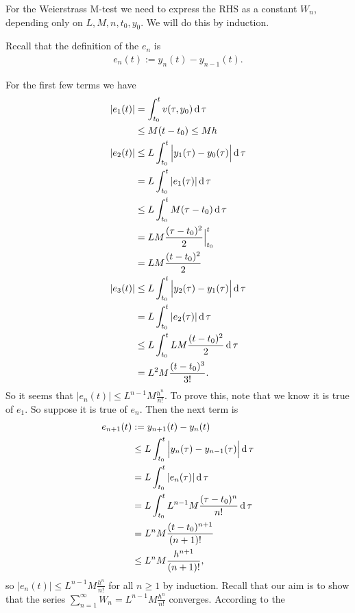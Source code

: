 For the Weierstrass M-test we need to express the RHS as a constant $W_n$,
depending only on $L, M, n, t_0, y_0$. We will do this by induction.

\newpage
Recall that the definition of the $e_n$ is
\begin{align*}
  e_n(t) := y_n(t) - y_{n-1}(t).
\end{align*}

For the first few terms we have
\begin{align*}
  |e_1(t)| &    = \int_{t_0}^t v(\tau, y_0) \operatorname{\text{d}}\tau\\
           & \leq M(t - t_0) \leq Mh\\
  |e_2(t)| & \leq L\int_{t_0}^t \Big|y_1(\tau) - y_0(\tau)\Big| \operatorname{\text{d}}\tau\\
           &    = L\int_{t_0}^t |e_1(\tau)| \operatorname{\text{d}}\tau\\
           & \leq L\int_{t_0}^t M(\tau - t_0) \operatorname{\text{d}}\tau\\
           &    = LM\frac{(\tau - t_0)^2}{2} \Big|_{t_0}^t \\
           &    = LM\frac{(t - t_0)^2}{2} \\
  |e_3(t)| & \leq L\int_{t_0}^t \Big|y_2(\tau) - y_1(\tau)\Big| \operatorname{\text{d}}\tau\\
           &    = L\int_{t_0}^t |e_2(\tau)| \operatorname{\text{d}}\tau\\
           & \leq L\int_{t_0}^t LM\frac{(t - t_0)^2}{2} \operatorname{\text{d}}\tau\\
           &    = L^2M\frac{(t - t_0)^3}{3!}.
\end{align*}
So it seems that $|e_n(t)| \leq L^{n-1}M\frac{h^n}{n!}$. To prove this, note that we know
it is true of $e_1$. So suppose it is true of $e_n$. Then the next term is
\begin{align*}
  e_{n+1}(t) &   := y_{n+1}(t) - y_n(t)\\
            & \leq L\int_{t_0}^t \Big|y_n(\tau) - y_{n-1}(\tau)\Big| \operatorname{\text{d}}\tau\\
            &=     L\int_{t_0}^t |e_n(\tau)| \operatorname{\text{d}}\tau\\
            &=     L\int_{t_0}^t L^{n-1}M\frac{(\tau - t_0)^n}{n!} \operatorname{\text{d}}\tau\\
            &=     L^nM\frac{(t - t_0)^{n+1}}{(n+1)!^{~~~}}\\
            & \leq L^nM\frac{h^{n+1}}{(n+1)!},
\end{align*}
so $|e_n(t)| \leq L^{n-1}M\frac{h^n}{n!}$ for all $n \geq 1$ by induction.
\newpage
Recall that our aim is to show that the series
$\sum_{n=1}^\infty W_n = L^{n-1}M\frac{h^n}{n!}$ converges. According to the

